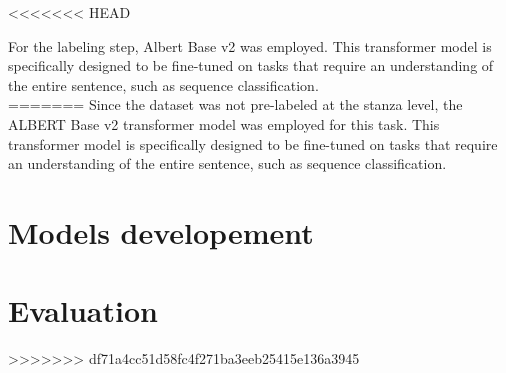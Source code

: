 <<<<<<< HEAD

For the labeling step, Albert Base v2\cite{albert-base-v2}
was employed. This transformer model is specifically designed to be fine-tuned on
tasks that require an understanding of the entire sentence, such as sequence
classification.\\
=======
Since the dataset was not pre-labeled at the stanza level, the ALBERT Base v2 transformer model was employed for this task.
This transformer model is specifically designed to be fine-tuned on tasks that
require an understanding of the entire sentence, such as sequence classification.\\


\section{Models developement}
\section{Evaluation}

>>>>>>> df71a4cc51d58fc4f271ba3eeb25415e136a3945
